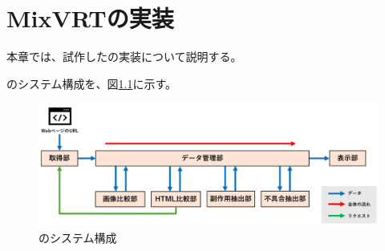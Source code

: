 \chapter{MixVRTの実装}\label{cha:Implementation}
本章では、試作した\toolName の実装について説明する。
\par
\toolName のシステム構成を、図\ref{fig:System}に示す。
\begin{figure}[tp]
    \begin{center}
        \includegraphics[width=1.0\columnwidth]{image/4_System_2.png}
        \caption{\toolName のシステム構成}
        \label{fig:System}
    \end{center}
\end{figure}
